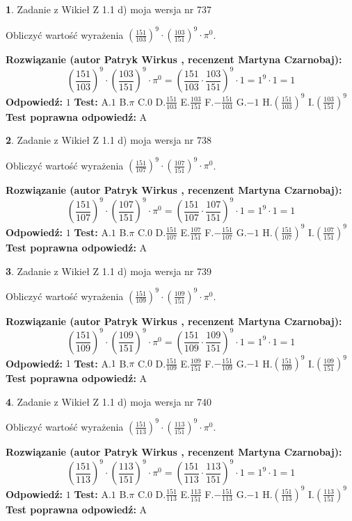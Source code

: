 \documentclass[12pt, a4paper]{article}
\theoremstyle{definition} %
\newtheorem{zad}{}
\newcommand{\zadStart}[1]{\begin{zad}#1\newline}
\newcommand{\zadStop}{\end{zad}}
\newcommand{\rozwStart}[2]{\noindent \textbf{Rozwiązanie (autor #1 , recenzent #2): }\newline}
\newcommand{\rozwStop}{\newline}
\newcommand{\odpStart}{\noindent \textbf{Odpowiedź:}\newline}
\newcommand{\odpStop}{\newline}
\newcommand{\testStart}{\noindent \textbf{Test:}\newline}
\newcommand{\testStop}{\newline}
\newcommand{\kluczStart}{\noindent \textbf{Test poprawna odpowiedź:}\newline}
\newcommand{\kluczStop}{\newline}
\begin{document}
\zadStart{Zadanie z Wikieł Z 1.1 d) moja wersja nr 737}

Obliczyć wartość wyrażenia $(\frac{151}{103})^{9} \cdot (\frac{103}{151})^{9} \cdot \pi^{0}$.
\zadStop
\rozwStart{Patryk Wirkus}{Martyna Czarnobaj}
$$(\frac{151}{103})^{9} \cdot (\frac{103}{151})^{9} \cdot \pi^{0} = (\frac{151}{103} \cdot \frac{103}{151})^{9} \cdot 1 = 1^{9} \cdot 1 = 1$$
\rozwStop
\odpStart
$1$
\odpStop
\testStart
A.$1$ B.$\pi$ C.$0$ D.$\frac{151}{103}$ E.$\frac{103}{151}$
F.$-\frac{151}{103}$ G.$-1$
H.$(\frac{151}{103})^{9}$
I.$(\frac{103}{151})^{9}$
\testStop
\kluczStart
A
\kluczStop



\zadStart{Zadanie z Wikieł Z 1.1 d) moja wersja nr 738}

Obliczyć wartość wyrażenia $(\frac{151}{107})^{9} \cdot (\frac{107}{151})^{9} \cdot \pi^{0}$.
\zadStop
\rozwStart{Patryk Wirkus}{Martyna Czarnobaj}
$$(\frac{151}{107})^{9} \cdot (\frac{107}{151})^{9} \cdot \pi^{0} = (\frac{151}{107} \cdot \frac{107}{151})^{9} \cdot 1 = 1^{9} \cdot 1 = 1$$
\rozwStop
\odpStart
$1$
\odpStop
\testStart
A.$1$ B.$\pi$ C.$0$ D.$\frac{151}{107}$ E.$\frac{107}{151}$
F.$-\frac{151}{107}$ G.$-1$
H.$(\frac{151}{107})^{9}$
I.$(\frac{107}{151})^{9}$
\testStop
\kluczStart
A
\kluczStop



\zadStart{Zadanie z Wikieł Z 1.1 d) moja wersja nr 739}

Obliczyć wartość wyrażenia $(\frac{151}{109})^{9} \cdot (\frac{109}{151})^{9} \cdot \pi^{0}$.
\zadStop
\rozwStart{Patryk Wirkus}{Martyna Czarnobaj}
$$(\frac{151}{109})^{9} \cdot (\frac{109}{151})^{9} \cdot \pi^{0} = (\frac{151}{109} \cdot \frac{109}{151})^{9} \cdot 1 = 1^{9} \cdot 1 = 1$$
\rozwStop
\odpStart
$1$
\odpStop
\testStart
A.$1$ B.$\pi$ C.$0$ D.$\frac{151}{109}$ E.$\frac{109}{151}$
F.$-\frac{151}{109}$ G.$-1$
H.$(\frac{151}{109})^{9}$
I.$(\frac{109}{151})^{9}$
\testStop
\kluczStart
A
\kluczStop



\zadStart{Zadanie z Wikieł Z 1.1 d) moja wersja nr 740}

Obliczyć wartość wyrażenia $(\frac{151}{113})^{9} \cdot (\frac{113}{151})^{9} \cdot \pi^{0}$.
\zadStop
\rozwStart{Patryk Wirkus}{Martyna Czarnobaj}
$$(\frac{151}{113})^{9} \cdot (\frac{113}{151})^{9} \cdot \pi^{0} = (\frac{151}{113} \cdot \frac{113}{151})^{9} \cdot 1 = 1^{9} \cdot 1 = 1$$
\rozwStop
\odpStart
$1$
\odpStop
\testStart
A.$1$ B.$\pi$ C.$0$ D.$\frac{151}{113}$ E.$\frac{113}{151}$
F.$-\frac{151}{113}$ G.$-1$
H.$(\frac{151}{113})^{9}$
I.$(\frac{113}{151})^{9}$
\testStop
\kluczStart
A
\kluczStop
\end{document}
